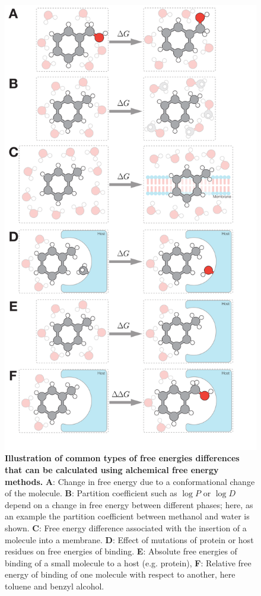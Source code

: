 \documentclass[9pt,bestpractices]{livecoms}
\begin{document}
\begin{figure}
    \includegraphics[width=0.95\linewidth]{figures/fig1_what_is_alchemy/Figure.pdf}   
    \caption{\textbf{Illustration of common types of free energies differences that can be calculated using alchemical free energy methods.} \textbf{A}: Change in free energy due to a conformational change of the molecule. \textbf{B}: Partition coefficient such as $\log P$ or $\log D$ depend on a change in free energy between different phases; here, as an example the partition coefficient between methanol and water is shown. \textbf{C}: Free energy difference associated with the insertion of a molecule into a membrane. \textbf{D}: Effect of mutations of protein or host residues on free energies of binding. \textbf{E}: Absolute free energies of binding of a small molecule to a host (e.g. protein), \textbf{F}: Relative free energy of binding of one molecule with respect to another, here toluene and benzyl alcohol.
    \label{fig:fig_what_is_alchemy}
    }
\end{figure}
%
\end{document}
